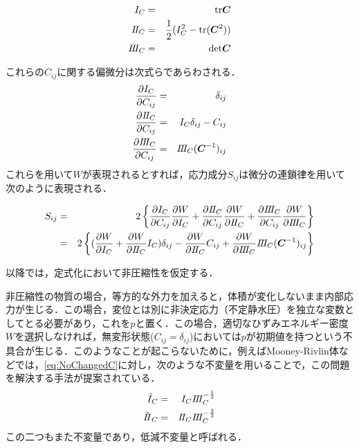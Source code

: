 \begin{eqnarray}\label{eq:NoChangedC}
	I_C &=& \mathrm{tr}{\mbox{\boldmath $C$}} \\
	I\hspace{-.2em}I_C &=& \frac{1}{2} (I_C^2 - \mathrm{tr}({\mbox{\boldmath $C$}}^2)) \\
	I\hspace{-.2em}I\hspace{-.2em}I_C &=& \mathrm{det} {\mbox{\boldmath $C$}}
\end{eqnarray}

これらの$ C_{ij} $に関する偏微分は次式らであらわされる．
\begin{eqnarray}\label{eq:PartialChangedC}
	\frac{\partial I_C}{\partial C_{ij}} &=& \delta_{ij} \\
	\frac{\partial I\hspace{-.2em}I_C}{\partial C_{ij}} &=& I_C \delta_{ij}-C_{ij} \\
	\frac{\partial I\hspace{-.2em}I\hspace{-.2em}I_C}{\partial C_{ij}} &=& I\hspace{-.2em}I\hspace{-.2em}I_C({\mbox{\boldmath $C$}}^{-1})_{ij}
\end{eqnarray}
これらを用いて$ W $が表現されるとすれば，応力成分$ S_{ij} $は微分の連鎖律を用いて次のように表現される．

\begin{eqnarray}\label{eq:StrainVer2}
	S_{ij} &=& 2\left\{	\partdf{I_C}{C_{ij}} \partdf{W}{I_C} + \partdf{\Two_C}{C_{ij}} \partdf{W}{\Two_C} + \partdf{\Three_C}{C_{ij}} \partdf{W}{\Three_C} \right\} \\
	&=& 2\left\{	(\partdf{W}{I_C} +  \partdf{W}{\Two_C} I_C)\delta_{ij} - \partdf{W}{\Two_C}C_{ij} +  \partdf{W}{\Three_C} \Three_C(\bd{C}^{-1})_{ij}\right\}
\end{eqnarray}

以降では，定式化において非圧縮性を仮定する．

非圧縮性の物質の場合，等方的な外力を加えると，体積が変化しないまま内部応力が生じる．この場合，変位とは別に非決定応力（不定静水圧）を独立な変数としてとる必要があり，これを$ p $と置く．この場合，適切なひずみエネルギー密度$ W $を選択しなければ，無変形状態($ C_{ij}  = \delta_{ij}$)においては$ p $が初期値を持つという不具合が生じる．このようなことが起こらないために，例えばMooney-Rivlin体などでは，\eqref{eq:NoChangedC}に対し，次のような不変量を用いることで，この問題を解決する手法が提案されている．
\begin{eqnarray}
	\tilde{I}_C &=& I_C I\hspace{-.2em}I\hspace{-.2em}I_C^{-\frac{1}{3}} \\
	\tilde{I\hspace{-.2em}I}_C &=& I\hspace{-.2em}I_C I\hspace{-.2em}I\hspace{-.2em}I_C^{-\frac{2}{3}}
\end{eqnarray}
この二つもまた不変量であり，低減不変量と呼ばれる．


